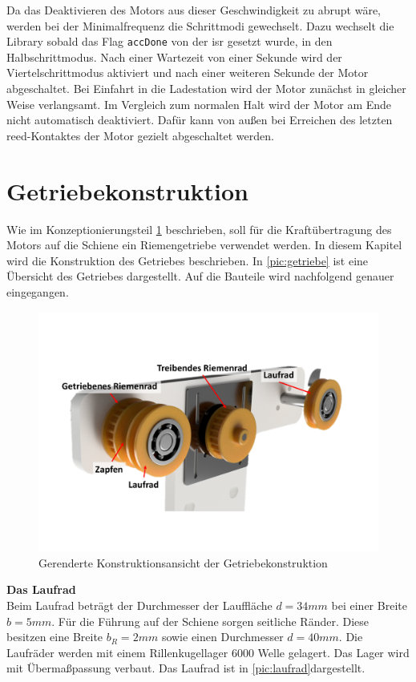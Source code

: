 Da das Deaktivieren des Motors aus dieser Geschwindigkeit zu abrupt wäre, werden bei der Minimalfrequenz die Schrittmodi gewechselt. Dazu wechselt die Library sobald  das Flag \texttt{accDone} von der \acrshort{isr} gesetzt wurde, in den Halbschrittmodus. Nach einer Wartezeit von einer Sekunde wird der Viertelschrittmodus aktiviert und nach einer weiteren Sekunde der Motor abgeschaltet. Bei Einfahrt in die Ladestation wird der Motor zunächst in gleicher Weise verlangsamt. Im Vergleich zum normalen Halt wird der Motor am Ende nicht automatisch deaktiviert. Dafür kann von außen bei Erreichen des letzten \acrshort{reed}-Kontaktes der Motor gezielt abgeschaltet werden. 

\section{Getriebekonstruktion}
\label{sec:getriebekonstruktion}
Wie im Konzeptionierungsteil \ref{sec:getriebekonstruktion} beschrieben, soll für die Kraftübertragung des Motors auf die Schiene ein Riemengetriebe verwendet werden. In diesem Kapitel wird die Konstruktion des Getriebes beschrieben. In \autoref{pic:getriebe} ist eine Übersicht des Getriebes dargestellt. Auf die Bauteile wird nachfolgend genauer eingegangen. 

\begin{figure}[h]
	\begin{center}
		\includegraphics[width=12cm]{getriebe.pdf}
		\caption{Gerenderte Konstruktionsansicht der Getriebekonstruktion}
		\label{pic:getriebe}
	\end{center}
\end{figure} 



\textbf{Das Laufrad}\\
Beim Laufrad beträgt der Durchmesser der Lauffläche $d=34mm$ bei einer Breite $b=5mm$. Für die Führung auf der Schiene sorgen seitliche Ränder. Diese besitzen eine Breite $b_R=2mm$ sowie einen Durchmesser $d=40mm$. Die Laufräder werden mit einem Rillenkugellager 6000 Welle gelagert. Das Lager wird mit Übermaßpassung verbaut. Das Laufrad ist in \autoref{pic:laufrad}dargestellt. \\

